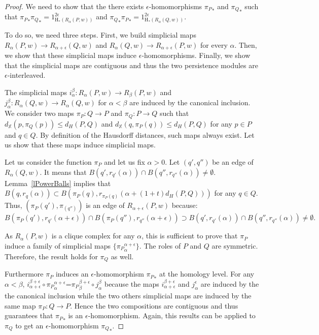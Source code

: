 \documentclass[a4paper]{article}
\newcommand\X{\mathbb{X}}
\newcommand\dX[2]{d_\X(#1,#2)}
\newcommand{\Hom}{\mathrm{H_*}}
\begin{document}
\begin{proof}
We need to show that the there exists $\epsilon$-homomorphisms ${\pi_P}_*$ and ${\pi_Q}_*$ such that ${\pi_P}_*{\pi_Q}_*=1_{\Hom(R_\alpha(P,w))}^{2\epsilon}$ and ${\pi_Q}_*{\pi_P}_*=1_{\Hom(R_\alpha(Q,w))}^{2\epsilon}$.

To do so, we need three steps.
First, we build simplicial maps $R_\alpha(P,w)\to R_{\alpha+\epsilon}(Q,w)$ and $R_\alpha(Q,w)\to R_{\alpha+\epsilon}(P,w)$ for every $\alpha$.
Then, we show that these simplicial maps induce $\epsilon$-homomorphisms.
Finally, we show that the simplicial maps are contiguous and thus the two persistence modules are $\epsilon$-interleaved.



The simplicial maps $i_\alpha^\beta:R_\alpha(P,w)\to R_\beta(P,w)$ and $j_\alpha^\beta:R_\alpha(Q,w)\to R_\alpha(Q,w)$ for $\alpha<\beta$ are induced by the canonical inclusion. 
We consider two maps $\pi_P:Q\to P$ and $\pi_Q:P\to Q$ such that $\dX{p}{\pi_Q(p)}\leq d_H(P,Q)$ and $\dX{q}{\pi_P(q)}\leq d_H(P,Q)$ for any $p\in P$ and $q\in Q$.
By definition of the Hausdorff distances, such maps always exist.
Let us show that these maps induce simplicial maps.

Let us consider the function $\pi_P$ and let us fix $\alpha>0$.
Let $(q',q'')$ be an edge of $R_\alpha(Q,w)$. 
It means that $B(q',r_{q'}(\alpha))\cap B(q'',r_{q''}(\alpha))\neq\emptyset$.
Lemma~\ref{lPowerBalls} implies that $B(q,r_q(\alpha))\subset B(\pi_P(q),r_{\pi_P(q)}(\alpha+(1+t)d_H(P,Q)))$ for any $q\in Q$.
Thus, $(\pi_P(q'),\pi_(q''))$ is an edge of $R_{\alpha+\epsilon}(P,w)$ because:
$$B(\pi_P(q'),r_{q'}(\alpha+\epsilon))\cap B(\pi_P(q''),r_{q''}(\alpha+\epsilon))\supset B(q',r_{q'}(\alpha))\cap B(q'',r_{q''}(\alpha))\neq\emptyset.$$

As $R_{\alpha}(P,w)$ is a clique complex for any $\alpha$, this is sufficient to prove that $\pi_P$ induce a family of simplicial maps $\{{\pi_P}_\alpha^{\alpha+\epsilon}\}$.
The roles of $P$ and $Q$ are symmetric.
Therefore, the result holds for $\pi_Q$ as well.





Furthermore $\pi_P$ induces an $\epsilon$-homomorphism ${\pi_P}_*$ at the homology level. 
For any $\alpha<\beta$, $i_{\alpha+\epsilon}^{\beta+\epsilon}\circ{\pi_P}_{\alpha}^{\alpha+\epsilon}$=${\pi_P}_{\beta}^{\beta+\epsilon}\circ j_\alpha^\beta$ because the maps $i_{\alpha+\epsilon}^{\beta+\epsilon}$ and $j_\alpha^\epsilon$ are induced by the the canonical inclusion while the two others simplicial maps are induced by the same map $\pi_P:Q\to P$.
Hence the two compositions are contiguous and thus guarantees that ${\pi_P}_*$ is an $\epsilon$-homomorphism. 
Again, this results can be applied to $\pi_Q$ to get an $\epsilon$-homomorphism ${\pi_Q}_*$.


\end{proof}
\end{document}
